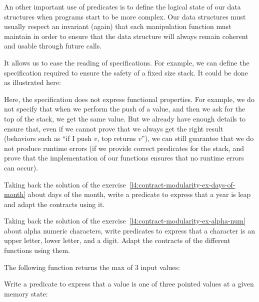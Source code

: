 

An other important use of predicates is to define the logical state of
our data structures when programs start to be more complex. Our data
structures must usually respect an invariant (again) that each
manipulation function must maintain in order to ensure that the data
structure will always remain coherent and usable through future calls.



It allows us to ease the reading of specifications. For example, we can
define the specification required to ensure the safety of a fixed size
stack. It could be done as illustrated here:






Here, the specification does not express functional properties. For
example, we do not specify that when we perform the push of a value, and
then we ask for the top of the stack, we get the same value. But we
already have enough details to ensure that, even if we cannot prove that
we always get the right result (behaviors such as ``if I push \(v\), top
returns \(v\)''), we can still guarantee that we do not produce runtime
errors (if we provide correct predicates for the stack, and prove
that the implementation of our functions ensures that no runtime errors
can occur).






Taking back the solution of the
exercise~\ref{l4:contract-modularity-ex-days-of-month} about days of the month,
write a predicate to express that a year is leap and adapt the contracts using
it.




Taking back the solution of the
exercise~\ref{l4:contract-modularity-ex-alpha-num} about alpha numeric
characters, write predicates to express that a character is an upper letter,
lower letter, and a digit. Adapt the contracts of the different functions using
them.




The following function returns the max of 3 input values:




Write a predicate to express that a value is one of three pointed values at a
given memory state:

